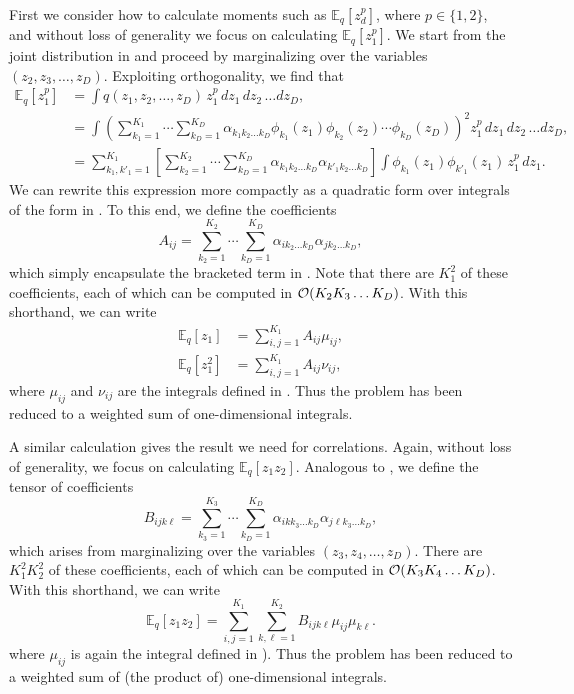 First we consider how to calculate moments such as $\mathbb{E}_q[z_d^p]$, where $p\in\{1,2\}$, and without loss of generality we focus on calculating $\mathbb{E}_q[z_1^p]$.
We start from the joint distribution in 
and proceed by marginalizing over the variables $(z_2,z_3,\ldots,z_D)$.
%
Exploiting orthogonality, we find that
\begin{align}
  \mathbb{E}_q[z_1^p]
    &= \int\! q(z_1,z_2,\ldots,z_D)\, z_1^p\, dz_1\, dz_2\, \ldots dz_D, \\
    &= \int\! \left(\sum_{k_1=1}^{K_1} \cdots \sum_{k_D=1}^{K_D} \alpha_{k_1 k_2 \ldots k_D}\phi_{k_1}(z_1)\phi_{k_2}(z_2)\cdots\phi_{k_D}(z_D)\right)^2\! z_1^p\, dz_1\, dz_2\, \ldots dz_D, \\
   &= \sum_{k_1,k'_1=1}^{K_1} \left[\sum_{k_2=1}^{K_2} \cdots \sum_{k_D=1}^{K_D} \alpha_{k_1 k_2 \ldots k_D} \alpha_{k'_1 k_2 \ldots k_D}\right] \int\! \phi_{k_1}(z_1)\phi_{k'_1}(z_1)\, z_1^p\, dz_1. \label{eq:marginal1}
\end{align}
We can rewrite this expression more compactly as a quadratic form over integrals
of the form in .
To this end, we define the coefficients
\begin{equation}
    A_{ij} = \sum_{k_2=1}^{K_2}\cdots\sum_{k_D=1}^{K_D} \alpha_{i k_2 \ldots k_D} \alpha_{j k_2
    \ldots k_D},
    \label{eq:Aij}
\end{equation}
which simply encapsulate the bracketed term in .
Note that there are $K_1^2$ of these coefficients, each of which can be
computed in $\mathcal{O}(K_2 K_3\ldots K_D)$.
With this shorthand, we can write
\begin{align}
    \mathbb{E}_q[z_1] &= \sum_{i,j=1}^{K_1} A_{ij} \mu_{ij}, \label{eq:Amu}\\
    \mathbb{E}_q[z_1^2] & = \sum_{i,j=1}^{K_1} A_{ij} \nu_{ij}, \label{eq:Anu}
\end{align}
where $\mu_{ij}$ and $\nu_{ij}$ are the integrals defined in
.
Thus the problem has been reduced to a weighted sum of one-dimensional integrals.

A similar calculation gives the result we need for correlations. Again, without loss of generality, we focus on calculating $\mathbb{E}_q[z_1 z_2]$.
Analogous to , we define the tensor of coefficients
\begin{equation}
B_{ijk\ell} = \sum_{k_3=1}^{K_3}\cdots\sum_{k_D=1}^{K_D} \alpha_{i k k_3 \ldots k_D} \alpha_{j \ell k_3 \ldots k_D},
\end{equation}
which arises from marginalizing over the variables $(z_3,z_4,\ldots,z_D)$.
%
There are $K_1^2 K_2^2$ of these coefficients, each of which can be computed
in $\mathcal{O}(K_3 K_4\ldots K_D)$. With this shorthand, we can write
\begin{equation}
    \mathbb{E}_q[z_1 z_2] = \sum_{i,j=1}^{K_1} \sum_{k,\ell=1}^{K_2} B_{ijk\ell}\mu_{ij}\mu_{k\ell}.
    \label{eq:Bmumu}
\end{equation}
where $\mu_{ij}$ is again the integral defined in ).
Thus the problem has been reduced to a weighted sum of (the product of)
one-dimensional integrals.

